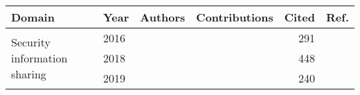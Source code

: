 
\newcommand*\rotatetitle[1]{\hbox to1.5em{\hss\rotatebox[origin=br]{45}{{\footnotesize #1}}}} %
\newcommand*\yes{{\footnotesize\CIRCLE}}
\newcommand*\partly{{\footnotesize\LEFTcircle}}
\newcommand*\nop{{\footnotesize\Circle}}


\newlength{\domaincollength}
\setlength{\domaincollength}{.18\textwidth}

\begin{threeparttable}

    \begin{tabular}{p{\domaincollength}llc@{}c@{}c@{}c@{}c@{}c@{}crr}
        \toprule %
        \textbf{Domain}                                                 & \textbf{Year} & \textbf{Authors}                                                      & \multicolumn{7}{c}{\textbf{Contributions}}                                                                                                                                                                                                                       & \multicolumn{1}{c}{\textbf{Cited}}  & \textbf{Ref.}                                            \\
        \midrule %
        \multirow{4}{\domaincollength}{Security information sharing}    & 2016          & \citeauthor*{skopik_problemsharedproblem_2016}                        & \yes                               & \nop                                & \nop                   & \nop                                 & \nop                                 & \yes                              & \nop                                       & 291                                 & \cite{skopik_problemsharedproblem_2016}                  \\ 
                                                                        & 2018          & \citeauthor*{tounsi_surveytechnicalthreat_2018}                       & \yes                               & \yes                                & \nop                   & \nop                                 & \nop                                 & \yes                              & \nop                                       & 448                                 & \cite{tounsi_surveytechnicalthreat_2018}                 \\
                                                                        & 2019          & \citeauthor*{wagner_Cyberthreatintelligence_2019a}                     & \yes                               & \yes                                & \nop                   & \nop                                 & \nop                                 & \yes                              & \nop                                       & 240                                 & \cite{wagner_Cyberthreatintelligence_2019a}               \\

\end{tabular}
\end{threeparttable}
